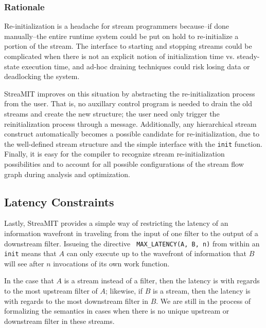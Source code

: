 \subsubsection{Rationale}

Re-initialization is a headache for stream programmers because--if
done manually--the entire runtime system could be put on hold to
re-initialize a portion of the stream.  The interface to starting and
stopping streams could be complicated when there is not an explicit
notion of initialization time vs. steady-state execution time, and
ad-hoc draining techniques could risk losing data or deadlocking the
system.

StreaMIT improves on this situation by abstracting the
re-initialization process from the user.  That is, no auxillary
control program is needed to drain the old streams and create the new
structure; the user need only trigger the reinitialization process
through a message.  Additionally, any hierarchical stream construct
automatically becomes a possible candidate for re-initialization, due
to the well-defined stream structure and the simple interface with the
{\tt init} function.  Finally, it is easy for the compiler to
recognize stream re-initialization possibilities and to account for
all possible configurations of the stream flow graph during analysis
and optimization.

\subsection{Latency Constraints}

Lastly, StreaMIT provides a simple way of restricting the latency of
an information wavefront in traveling from the input of one filter to
the output of a downstream filter.  Issueing the directive {\tt
MAX\_LATENCY(A, B, n)} from within an {\tt init} means that $A$ can
only execute up to the wavefront of information that $B$ will see
after $n$ invocations of its own work function.

In the case that $A$ is a stream instead of a filter, then the latency
is with regards to the most upstream filter of $A$; likewise, if $B$
is a stream, then the latency is with regards to the most downstream
filter in $B$.  We are still in the process of formalizing the
semantics in cases when there is no unique upstream or downstream
filter in these streams.


